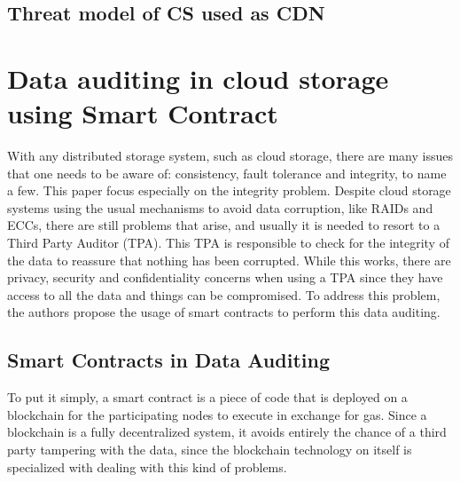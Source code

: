 \documentclass[14pt,oneside]{extreport}
\newcommand*\fpar{\hspace{1ex}}
\begin{document}
\section{Threat model of CS used as CDN}


\chapter{\Large{Data auditing in cloud storage using Smart Contract \cite{paper4}}}
\vspace{-2em}
\fpar With any distributed storage system, such as cloud storage, there are many issues that one needs to be aware of: consistency, fault tolerance and integrity, to name a few. This paper focus especially on the integrity problem. Despite cloud storage systems using the usual mechanisms to avoid data corruption, like RAIDs and ECCs, there are still problems that arise, and usually it is needed to resort to a Third Party Auditor (TPA). This TPA is responsible to check for the integrity of the data to reassure that nothing has been corrupted. While this works, there are privacy, security and confidentiality concerns when using a TPA since they have access to all the data and things can be compromised. To address this problem, the authors propose the usage of smart contracts to perform this data auditing.
\section{Smart Contracts in Data Auditing}
To put it simply, a smart contract is a piece of code that is deployed on a blockchain for the participating nodes to execute in exchange for gas. Since a blockchain is a fully decentralized system, it avoids entirely the chance of a third party tampering with the data, since the blockchain technology on itself is specialized with dealing with this kind of problems.
\end{document}
